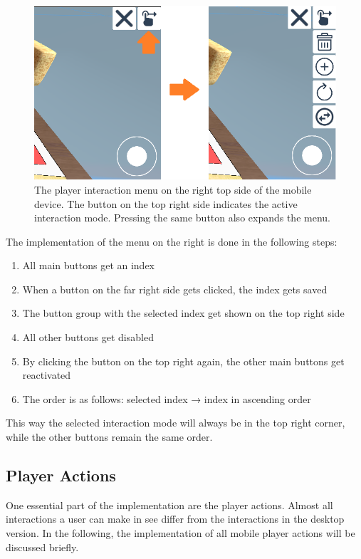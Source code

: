 \begin{figure}[htb]
    \centering
    \includegraphics[width=1\textwidth]{Implementation/img/menu.png}
    \caption{The player interaction menu on the right top side of the mobile device. The button on the top right side indicates the active interaction mode. Pressing the same button also expands the menu.}\label{fig:interaction_menu}
\end{figure}

The implementation of the menu on the right is done in the following steps:
\begin{enumerate}
    \item All main buttons get an index
    \item When a button on the far right side gets clicked, the index gets saved
    \item The button group with the selected index get shown on the top right side
    \item All other buttons get disabled
    \item By clicking the button on the top right again, the other main buttons get reactivated 
    \item The order is as follows: selected index → index in ascending order
\end{enumerate} 
This way the selected interaction mode will always be in the top right corner, while the other buttons remain the same order.

\subsection{Player Actions}
\label{sec:player_actions}

One essential part of the implementation are the player actions. 
Almost all interactions a user can make in \gls{see} differ from the interactions in the desktop version.
In the following, the implementation of all mobile player actions will be discussed briefly.

